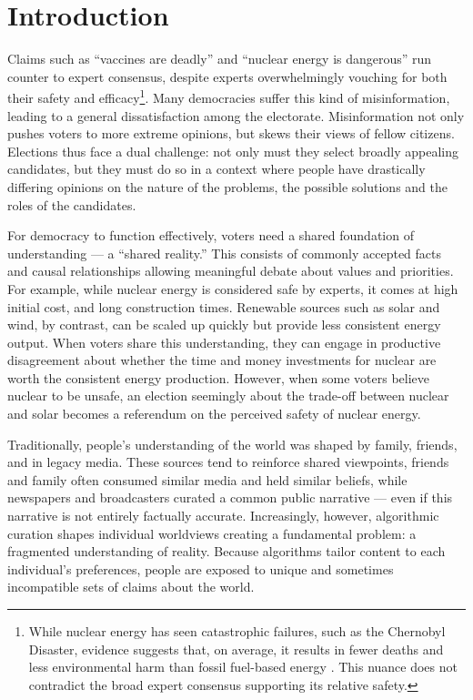 \newpage
\chapter{Introduction}
\label{Introduction}

Claims such as ``vaccines are deadly'' and ``nuclear energy is dangerous'' run
counter to expert consensus, despite experts overwhelmingly vouching for both
their safety and efficacy\footnote{While nuclear energy has seen catastrophic
	failures, such as the Chernobyl Disaster, evidence suggests that, on
	average, it results in fewer deaths and less environmental harm than
	fossil fuel-based energy \cite{ritchieWhatAreSafest2020}. This nuance
	does not contradict the broad expert consensus supporting its relative
	safety.}. Many democracies suffer this kind of misinformation, leading to a
general dissatisfaction among the electorate. Misinformation not only pushes
voters to more extreme opinions, but skews their views of fellow citizens.
Elections thus face a dual challenge: not only must they select broadly
appealing candidates, but they must do so in a context where people have
drastically differing opinions on the nature of the problems, the possible
solutions and the roles of the candidates.

For democracy to function effectively, voters need a shared foundation of
understanding --- a ``shared reality.'' This consists of commonly accepted
facts and causal relationships allowing meaningful debate about values and
priorities. For example, while nuclear energy is considered safe by experts, it
comes at high initial cost, and long construction times.
Renewable sources such as solar and wind, by contrast, can be scaled up quickly but provide less
consistent energy output. When voters share this understanding,
they can engage in productive disagreement about whether the time and money
investments for nuclear are worth the consistent energy production. However,
when some voters believe nuclear to be unsafe, an election seemingly about the
trade-off between nuclear and solar becomes a referendum on the perceived safety
of nuclear energy.


Traditionally, people's understanding of the world was shaped by family,
friends, and in legacy media. These sources tend to reinforce shared
viewpoints, friends and family often consumed similar media and held similar
beliefs, while newspapers and broadcasters curated a common public narrative
--- even if this narrative is not entirely factually accurate. Increasingly,
however, algorithmic curation shapes individual worldviews creating a
fundamental problem: a fragmented understanding of reality. Because algorithms
tailor content to each individual's preferences, people are exposed to unique
and sometimes incompatible sets of claims about the world.

